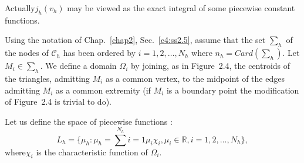 Actually\pageoriginale  $j_h(v_h)$ may be viewed as the exact integral of some piecewise constant functions.

Using the notation of Chap.~\ref{chap2}, Sec.~\ref{c4:ss2.5}, assume 
that the set $\sum_h$ of the nodes of $\mathscr{C}_h$ has been ordered 
by $i=1, 2, \ldots, N_h$ where $n_h = Card( \sum_h)$. Let $M_i \in 
\sum_h$. We define a domain $\Omega_i$ by joining, as in 
Figure~2.4, the centroids of the triangles, admitting $M_i$ as a common vertex, to the midpoint of the edges admitting $M_i$ as a common extremity (if $M_i$ is a boundary point the modification of 
Figure~2.4 is trivial to do).

\begin{figure}[H]
\caption{}
\end{figure} 

Let us define the space of piecewise functions :
\begin{equation}
L_h = \{\mu_h : \mu_h = \sum^{N_h}{i=1} \mu_i \chi_i, \mu_i \in
\mathbb{R}, i = 1, 2, \ldots, N_h\}, \tag{2.79}\label{c4:eq2.79} 
\end{equation}
where\pageoriginale  $\chi_i$ is the characteristic function of $\Omega_i$.

